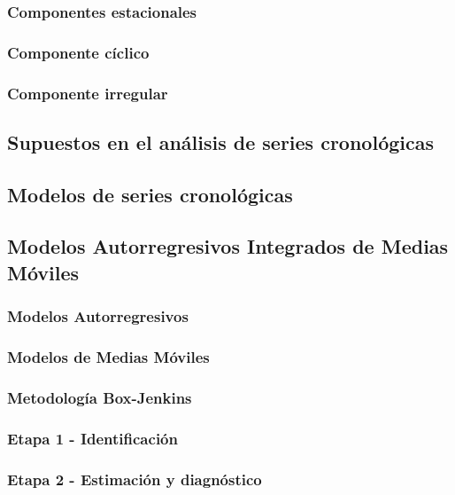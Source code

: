 \documentclass[
]{article}
\begin{document}
\subsubsection{Componentes estacionales}

\subsubsection{Componente cíclico}

\subsubsection{Componente irregular}

\subsection{Supuestos en el análisis de series cronológicas}

\subsection{Modelos de series cronológicas}

\subsection{Modelos Autorregresivos Integrados de Medias Móviles}

\subsubsection{Modelos Autorregresivos}

\subsubsection{Modelos de Medias Móviles}

\subsubsection{Metodología Box-Jenkins}

\subsubsection{Etapa 1 - Identificación}

\subsubsection{Etapa 2 - Estimación y diagnóstico}
\end{document}
